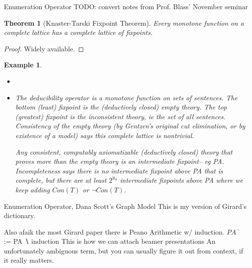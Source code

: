\documentclass[
	fontsize=10pt, %
	twoside=false, %
	secnumdepth=-1, %
]{kaobook}
\theoremstyle{break}
\newtheorem*{thm}{Theorem} %
\newtheorem*{Ex}{Example} %
\begin{document}
    \See Enumeration Operator
    TODO: convert notes from Prof. Blass' November seminar
    \begin{thm}[Knaster-Tarski Fixpoint Theorem]
        Every monotone function on a complete lattice has a complete lattice of fixpoints.
    \end{thm}
    \begin{proof}
        Widely available.
    \end{proof}
    \begin{Ex}
        \begin{itemize}
            \item[]
            \item The deducibility operator is a monotone function on sets of sentences.
                The bottom (least) fixpoint is the (deductively closed) empty theory.
                The top (greatest) fixpoint is the inconsistent theory, ie the set of all sentences.
                Consistency of the empty theory
                (by Gentzen's original cut elimination, or by existence of a model)
                says this complete lattice is nontrivial.

                Any consistent, computably axiomatizable (deductively closed) theory that proves more than the empty theory
                is an intermediate fixpoint-- eg PA.
                Incompleteness says there is no intermediate fixpoint above PA that is complete,
                but there are at least $2^{ℵ_0}$ intermediate fixpoints above PA where we keep adding $Con(T)$ or $¬Con(T)$.
        \end{itemize}
    \end{Ex}

    \See Enumeration Operator, Dana Scott's Graph Model
    This is my version of Girard's dictionary.

    Also afaik the most Girard paper there is
    Peano Arithmetic w/ induction.
    $PA^-$ := PA ∖ induction
    This is how we can attach beamer presentations
    An unfortunately ambiguous term,
    but you can usually figure it out from context,
    if it really matters.
\end{document}
